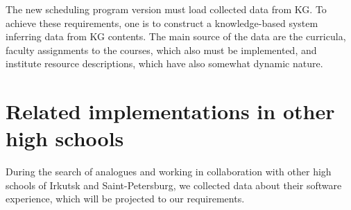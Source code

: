 \documentclass[
]{aiitart}
\begin{document}



The new scheduling program version must load collected data from KG.  To achieve these requirements, one is to construct a knowledge-based system inferring data from KG contents.  The main source of the data are the curricula, faculty assignments to the courses, which also must be implemented, and institute resource descriptions, which have also somewhat dynamic nature.

\section{Related implementations in other high schools}

During the search of analogues and working in collaboration with other high schools of Irkutsk and Saint-Petersburg, we collected data about their software experience, which will be projected to our requirements.
\end{document}
